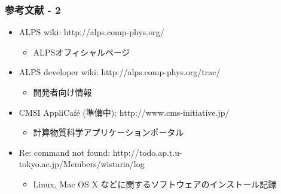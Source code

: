 \begin{frame}
  \frametitle{参考文献 - 2}
  \begin{itemize}
  \item ALPS wiki: http://alps.comp-phys.org/
    \begin{itemize}
      \item ALPSオフィシャルページ
    \end{itemize}
  \item ALPS developer wiki: http://alps.comp-phys.org/trac/
    \begin{itemize}
      \item 開発者向け情報
    \end{itemize}
  \item CMSI AppliCaf\'e (準備中): http://www.cms-initiative.jp/
    \begin{itemize}
      \item 計算物質科学アプリケーションポータル
    \end{itemize}
  \item Re: command not found: http://todo.ap.t.u-tokyo.ac.jp/Members/wistaria/log
    \begin{itemize}
      \item Linux, Mac OS X などに関するソフトウェアのインストール記録
    \end{itemize}
  \end{itemize}
\end{frame}


